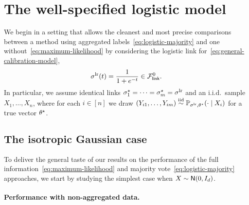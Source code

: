 \section{The well-specified logistic model}\label{sec:well-sepcified-mod}

We begin in a setting that allows the cleanest and most precise comparisons
between a method using aggregated labels~\eqref{eq:logistic-majority} and
one without~\eqref{eq:maximum-likelihood} by considering the logistic link
for~\eqref{eq:general-calibration-model},
\begin{align*}
  \sigma^{\textup{lr}}(t) = \frac{1}{1 + e^{-t}} \in \mathcal{F}_{\mathsf{link}}^0.
\end{align*}
In particular, we assume identical links $\sigma_1^\star = \dots =
\sigma_m^\star = \sigma^{\textup{lr}}$ and an i.i.d.\ sample $X_1, \ldots, X_n$, where
for each $i \in [n]$ we draw $(Y_{i1}, \ldots, Y_{im}) \stackrel{\textup{iid}}{\sim}
\mathbb{P}_{\sigma^{\textup{lr}},\theta^\star}(\cdot \mid X_i)$ for a true vector $\theta^\star$.


\subsection{The isotropic Gaussian case} \label{sec:gauss}

To deliver the general taste of our results on the performance of the full
information~\eqref{eq:maximum-likelihood} and majority
vote~\eqref{eq:logistic-majority} approaches, we start by studying the
simplest case when $X \sim \mathsf{N}(0, I_d)$.

\paragraph{Performance with non-aggregated data.}

